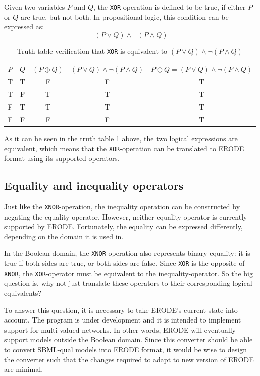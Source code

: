Given two variables $P$ and $Q$, the \texttt{XOR}-operation is defined to be true, if either $P$ or $Q$ are true, but not both. In propositional logic, this condition can be expressed as: 
\[
(P \lor Q) \land \neg{(P \land Q)}
\]
\begin{table}[H]
    \centering
    \begin{tabular}{|c|c|c|c|c|}
    \hline   
    $P$ & $Q$ & $(P \oplus Q)$ & $(P \lor Q) \land \neg{(P \land Q)}$ & $P \oplus Q = (P \lor Q) \land \neg{(P \land Q)}$  \\
    \hline
    T & T & F & F & T \\
    T & F & T & T & T \\
    F & T & T & T & T \\
    F & F & F & F & T \\
    \end{tabular}
    \caption{Truth table verification that \texttt{XOR} is equivalent to $(P \lor Q) \land \neg{(P \land Q)}$}
    \label{tab:verified_xor}
\end{table}
As it can be seen in the truth table \ref{tab:verified_xor} above, the two logical expressions are equivalent, which means that the \texttt{XOR}-operation can be translated to ERODE format using its supported operators.

\subsection{Equality and inequality operators}

Just like the \texttt{XNOR}-operation, the inequality operation can be constructed by negating the equality operator. However, neither equality operator is currently supported by ERODE. Fortunately, the equality can be expressed differently, depending on the domain it is used in.

In the Boolean domain, the \texttt{XNOR}-operation also represents binary equality: it is true if both sides are true, or both sides are false. Since \texttt{XOR} is the opposite of \texttt{XNOR}, the \texttt{XOR}-operator must be equivalent to the inequality-operator. So the big question is, why not just translate these operators to their corresponding logical equivalents?

To answer this question, it is necessary to take ERODE's current state into account. The program is under development and it is intended to implement support for multi-valued networks. In other words, ERODE will eventually support models outside the Boolean domain. Since this converter should be able to convert SBML-qual models into ERODE format, it would be wise to design the converter such that the changes required to adapt to new version of ERODE are minimal.

